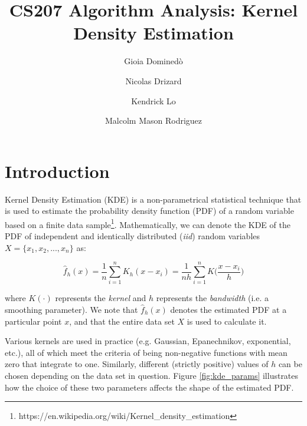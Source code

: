 \documentclass[11pt]{article}
\title{CS207 Algorithm Analysis: Kernel Density Estimation}
\author{Gioia Domined\`o \and Nicolas Drizard \and Kendrick Lo \and Malcolm Mason Rodriguez}
\begin{document}
\maketitle{}

\pagestyle{plain}

\section{Introduction}

Kernel Density Estimation (KDE) is a non-parametrical statistical technique that is used to estimate the probability density function (PDF) of a random variable based on a finite data sample\footnote{https://en.wikipedia.org/wiki/Kernel\_density\_estimation}.  Mathematically, we can denote the KDE of the PDF of independent and identically distributed (\textit{iid}) random variables $X=\{x_1, x_2, ..., x_n\}$ as:

\begin{equation} \label{eq:kde}
\hat{f}_h(x) = \frac{1}{n} \sum_{i=1}^n K_h(x - x_i) = \frac{1}{nh} \sum_{i=1}^n K \Big( \frac{x - x_i}{h} \Big)
\end{equation}

\noindent where $K(\cdot)$ represents the \textit{kernel} and $h$ represents the \textit{bandwidth} (i.e. a smoothing parameter). We note that $\hat{f}_h(x)$ denotes the estimated PDF at a particular point $x$, and that the entire data set $X$ is used to calculate it. \medskip

\noindent Various kernels are used in practice (e.g. Gaussian, Epanechnikov, exponential, etc.), all of which meet the criteria of being non-negative functions with mean zero that integrate to one. Similarly, different (strictly positive) values of $h$ can be chosen depending on the data set in question. Figure \ref{fig:kde_params} illustrates how the choice of these two parameters affects the shape of the estimated PDF.
\end{document}
